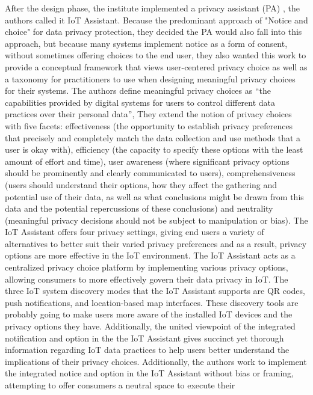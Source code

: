 \documentclass[conference]{IEEEtran}
\begin{document}
After the design phase, the institute implemented a privacy assistant (PA) \cite{FengDesign},
the authors called it IoT Assistant. Because the predominant approach of
"Notice and choice" for data privacy protection, they decided the PA would
also fall into this approach, but because many systems implement notice as
a form of consent, without sometimes offering choices to the end user, they
also wanted this work to provide a conceptual framework that views user-centered
privacy choice as well as a taxonomy for practitioners to use when designing
meaningful privacy choices for their systems. The authors define meaningful
privacy choices as ``the capabilities provided by digital systems for users to
control different data practices over their personal data'', They extend the
notion of privacy choices with five facets: effectiveness (the opportunity
to establish privacy preferences that precisely and completely match the data
collection and use methods that a user is okay with), efficiency (the capacity
to specify these options with the least amount of effort and time), user awareness
(where significant privacy options should be prominently and clearly communicated
to users), comprehensiveness (users should understand their options, how they
affect the gathering and potential use of their data, as well as what conclusions
might be drawn from this data and the potential repercussions of these conclusions)
and neutrality (meaningful privacy decisions should not be subject to manipulation
or bias). The IoT Assistant offers four privacy settings, giving end users a
variety of alternatives to better suit their varied privacy preferences and
as a result, privacy options are more effective in the IoT environment. The
IoT Assistant acts as a centralized privacy choice platform by implementing
various privacy options, allowing consumers to more effectively govern their
data privacy in IoT. The three IoT system discovery modes that the IoT Assistant
supports are QR codes, push notifications, and location-based map interfaces.
These discovery tools are probably going to make users more aware of the installed
IoT devices and the privacy options they have. Additionally, the united viewpoint
of the integrated notification and option in the the IoT Assistant gives succinct
yet thorough information regarding IoT data practices to help users better
understand the implications of their privacy choices. Additionally, the authors
work to implement the integrated notice and option in the IoT Assistant without
bias or framing, attempting to offer consumers a neutral space to execute their
\end{document}
